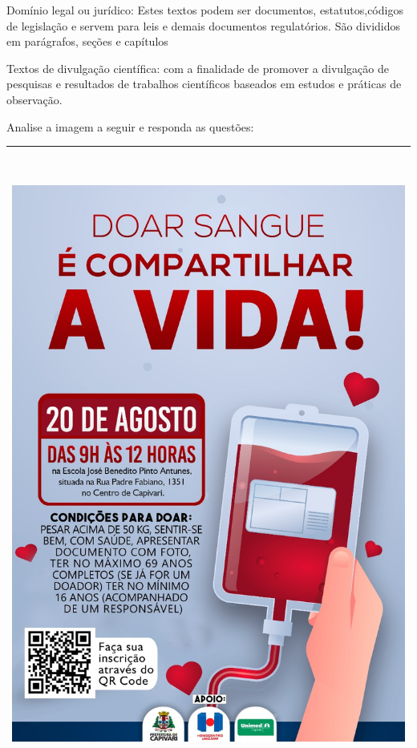 {{Domínio legal ou jurídico: Estes textos podem ser documentos,
estatutos,códigos de legislação e servem para leis e demais documentos
regulatórios. São divididos em parágrafos, seções e capítulos

Textos de divulgação científica: com a finalidade de promover a
divulgação de pesquisas e resultados de trabalhos científicos baseados
em estudos e práticas de observação.}


Analise a imagem a seguir e responda as questões:

\begin{longtable}[]{@{}l@{}}
\toprule
\endhead
\includegraphics[width=5.76042in,height=8.15278in]{./imgSAEB_7_POR/media/image1.png} \\
\bottomrule
\end{longtable}

}
